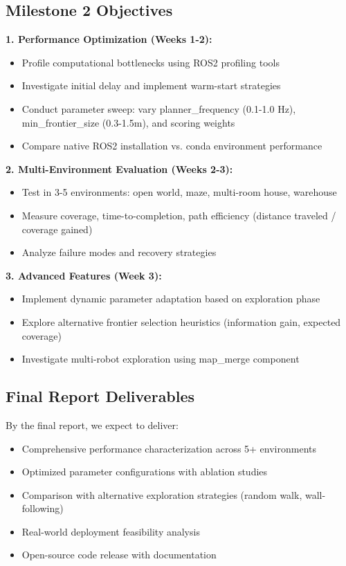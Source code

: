 \documentclass[conference]{IEEEtran}
\begin{document}
\subsection{Milestone 2 Objectives}

\textbf{1. Performance Optimization (Weeks 1-2):}
\begin{itemize}
    \item Profile computational bottlenecks using ROS2 profiling tools
    \item Investigate initial delay and implement warm-start strategies
    \item Conduct parameter sweep: vary planner\_frequency (0.1-1.0 Hz), min\_frontier\_size (0.3-1.5m), and scoring weights
    \item Compare native ROS2 installation vs. conda environment performance
\end{itemize}

\textbf{2. Multi-Environment Evaluation (Weeks 2-3):}
\begin{itemize}
    \item Test in 3-5 environments: open world, maze, multi-room house, warehouse
    \item Measure coverage, time-to-completion, path efficiency (distance traveled / coverage gained)
    \item Analyze failure modes and recovery strategies
\end{itemize}

\textbf{3. Advanced Features (Week 3):}
\begin{itemize}
    \item Implement dynamic parameter adaptation based on exploration phase
    \item Explore alternative frontier selection heuristics (information gain, expected coverage)
    \item Investigate multi-robot exploration using map\_merge component
\end{itemize}

\subsection{Final Report Deliverables}

By the final report, we expect to deliver:
\begin{itemize}
    \item Comprehensive performance characterization across 5+ environments
    \item Optimized parameter configurations with ablation studies
    \item Comparison with alternative exploration strategies (random walk, wall-following)
    \item Real-world deployment feasibility analysis
    \item Open-source code release with documentation
\end{itemize}
\end{document}
